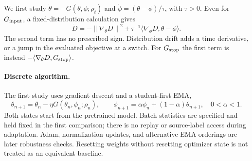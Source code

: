 \documentclass[11pt,a4paper]{article}
\newcommand{\norm}[1]{\left\lVert #1\right\rVert}
\begin{document}
We first study $\dot\theta=-G(\theta,\phi;\rho_t)$ and
$\dot\phi=(\theta-\phi)/\tau$, with $\tau>0$. Even for $G_{\rm input}$,
a fixed-distribution calculation gives
\begin{equation}
 \dot D=-\norm{\nabla_\theta D}^2
 +\tau^{-1}\langle\nabla_\phi D,\theta-\phi\rangle.
 \label{eq:energy}
\end{equation}
The second term has no prescribed sign. Distribution drift adds a time
derivative, or a jump in the evaluated objective at a switch. For
$G_{\rm stop}$ the first term is instead
$-\langle\nabla_\theta D,G_{\rm stop}\rangle$.

\paragraph{Discrete algorithm.}
The first study uses gradient descent and a student-first EMA,
\begin{equation}
 \theta_{n+1}=\theta_n-\eta G(\theta_n,\phi_n;\rho_n),\qquad
 \phi_{n+1}=\alpha\phi_n+(1-\alpha)\theta_{n+1},\quad 0<\alpha<1.
 \label{eq:discrete}
\end{equation}
Both states start from the pretrained model. Batch statistics are specified
and held fixed in the first comparison; there is no replay or source-label
access during adaptation. Adam, normalization updates, and alternative EMA
orderings are later robustness checks. Resetting weights without resetting
optimizer state is not treated as an equivalent baseline.
\end{document}
